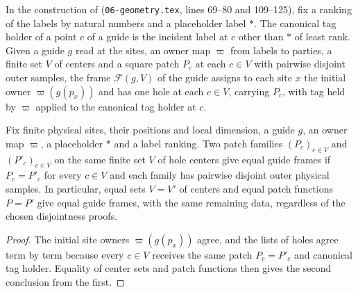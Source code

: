 \begin{definition}
    \label{def:peps_guide_frame}
    \leanok
    In the construction of \cite[Section~7]{OpenAI2026PolynomialPEPS} (\texttt{06-geometry.tex},
    lines 69--80 and 109--125), fix a ranking of the labels by natural numbers and a placeholder label $\ast$. The
    canonical tag holder of a point $c$ of a guide is the incident label at $c$
    other than $\ast$ of least rank. Given a guide $g$ read at the sites, an
    owner map $\varpi$ from labels to parties, a finite set $V$ of centers and a square
    patch $P_c$ at each $c\in V$ with pairwise disjoint outer samples, the frame $\mathcal F(g,V)$ of the
    guide assigns to each site $x$ the initial owner $\varpi(g(p_x))$ and has one hole at each $c\in V$, carrying $P_c$, with tag
    held by $\varpi$ applied to the canonical tag holder at $c$.
\end{definition}

\begin{lemma}
    \label{thm:peps_guide_frame_patch_congruence}
    \leanok
    Fix finite physical sites, their positions and local dimension, a guide $g$,
    an owner map $\varpi$, a placeholder $\ast$ and a label ranking.
    Two patch families $(P_c)_{c\in V}$ and $(P'_c)_{c\in V}$ on the same finite set $V$ of hole centers give equal
    guide frames if $P_c=P'_c$ for every $c\in V$ and each family has
    pairwise disjoint outer physical samples. In particular, equal sets $V=V'$ of
    centers and equal patch functions $P=P'$ give equal guide frames, with the same
    remaining data, regardless of the chosen disjointness proofs.
\end{lemma}

\begin{proof}\leanok
    The initial site owners $\varpi(g(p_x))$ agree, and the lists of holes agree term by term because every
    $c\in V$ receives the same patch $P_c=P'_c$ and canonical tag holder. Equality of
    center sets and patch functions then gives the second conclusion from the first.
\end{proof}

